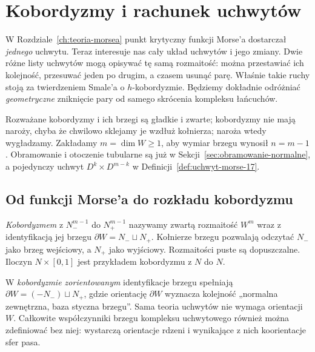 \chapter{Kobordyzmy i rachunek uchwytów}
\label{ch:rachunek-uchwytow}

W Rozdziale~\ref{ch:teoria-morsea} punkt krytyczny
funkcji Morse'a dostarczał \emph{jednego} uchwytu.
Teraz interesuje nas cały układ uchwytów i jego
zmiany. Dwie różne listy uchwytów mogą opisywać tę
samą rozmaitość: można przestawiać ich kolejność,
przesuwać jeden po drugim, a czasem usunąć parę.
Właśnie takie ruchy stoją za twierdzeniem Smale'a
o $h$-kobordyzmie. Będziemy dokładnie odróżniać
\emph{geometryczne} zniknięcie pary od samego
skrócenia kompleksu łańcuchów.

Rozważane kobordyzmy i ich brzegi są gładkie i zwarte;
kobordyzmy nie mają naroży, chyba że chwilowo sklejamy je
wzdłuż kołnierza; naroża wtedy wygładzamy.
Zakładamy $m=\dim W\geq1$, aby wymiar brzegu wynosił
$n=m-1$. Obramowanie i otoczenie tubularne są już
w Sekcji~\ref{sec:obramowanie-normalne}, a pojedynczy
uchwyt $D^k\times D^{m-k}$ w
Definicji~\ref{def:uchwyt-morse-17}.

\section{Od funkcji Morse'a do rozkładu kobordyzmu}
\label{sec:kobordyzm-18}

\begin{definicja}[Kobordyzm]
\label{def:kobordyzm-18}
\emph{Kobordyzmem} z $N_-^{m-1}$ do
$N_+^{m-1}$ nazywamy zwartą rozmaitość $W^m$
wraz z identyfikacją jej brzegu
$\partial W=N_-\sqcup N_+$.
Kołnierze brzegu pozwalają odczytać $N_-$
jako brzeg wejściowy, a $N_+$ jako wyjściowy.
Rozmaitości puste są dopuszczalne. Iloczyn
$N\times[0,1]$ jest przykładem kobordyzmu
z $N$ do $N$.
\end{definicja}

W \emph{kobordyzmie zorientowanym} identyfikacje brzegu
spełniają $\partial W=(-N_-)\sqcup N_+$,
gdzie orientację $\partial W$ wyznacza kolejność
„normalna zewnętrzna, baza styczna brzegu”.
Sama teoria uchwytów nie wymaga orientacji $W$.
Całkowite współczynniki brzegu kompleksu uchwytowego
również można zdefiniować bez niej: wystarczą orientacje
rdzeni i wynikające z nich koorientacje sfer pasa.

